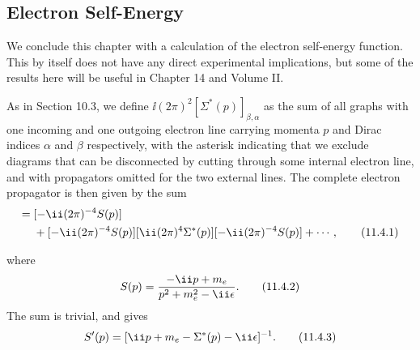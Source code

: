 
\subsection{Electron Self-Energy}

We conclude this chapter with a calculation of the electron self-energy
function. This by itself does not have any direct experimental implications,
but some of the results here will be useful in Chapter 14 and Volume II.

As in Section 10.3, we define $\ii(2\pi)^2[\Sigma^*(p)]_{\beta,\alpha}$ as the sum
of all graphs with one incoming and one outgoing electron line carrying momenta
$p$ and Dirac indices $\alpha$ and $\beta$ respectively, with the asterisk
indicating that we exclude diagrams that can be disconnected by cutting
through some internal electron line, and with propagators omitted for the two
external lines. The complete electron propagator is then given by the sum
\begin{align}
[-\ii(2\pi)^{-4}S'(p)]={}&[-\ii(2\pi)^{-4}S(p)]\notag\\
&+[-\ii(2\pi)^{-4}S(p)][\ii(2\pi)^4\Sigma^*(p)]
[-\ii(2\pi)^{-4}S(p)]+\cdots,
\tag{11.4.1}\label{eq:11.4.1}
\end{align}



where
\begin{equation}
S(p)=\frac{-\ii\sl{p}+m_e}{p^2+m_e^2-\ii\epsilon}.
\tag{11.4.2}\label{eq:11.4.2}
\end{equation}
The sum is trivial, and gives
\begin{equation}
S'(p)=[\ii\sl{p}+m_e-\Sigma^*(p)-\ii\epsilon]^{-1}.
\tag{11.4.3}\label{eq:11.4.3}
\end{equation}

